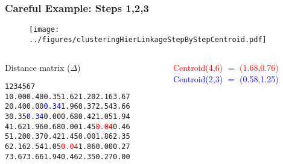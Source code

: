 \documentclass{beamer}
\begin{document}
\begin{frame}[fragile]
\frametitle{Careful Example: Steps 1,2,3}

\begin{figure}[h!]
  \centering
  \texttt{[image: ../figures/clusteringHierLinkageStepByStepCentroid.pdf]}
\end{figure}

\begin{columns}[T]
\begin{column}{.45\textwidth}
Distance matrix ($\Delta$)
\tiny
\begin{alltt}
     1    2    3    4    5    6    7
1 0.00 0.40 0.35 1.62 1.20 2.16 3.67
2 0.40 0.00 \textcolor{blue}{0.34} 1.96 0.37 2.54 3.66
3 0.35 \textcolor{blue}{0.34} 0.00 0.68 0.42 1.05 1.94
4 1.62 1.96 0.68 0.00 1.45 \textcolor{red}{0.04} 0.46
5 1.20 0.37 0.42 1.45 0.00 1.86 2.35
6 2.16 2.54 1.05 \textcolor{red}{0.04} 1.86 0.00 0.27
7 3.67 3.66 1.94 0.46 2.35 0.27 0.00
\end{alltt}
\end{column}
\begin{column}{.55\textwidth}
\textcolor{red}{Centroid(4,6) $=$ (1.68,0.76)} \\
\textcolor{blue}{Centroid(2,3) $=$ (0.58,1.25)} \\
\end{column}
\end{columns}
\end{frame}
\end{document}
